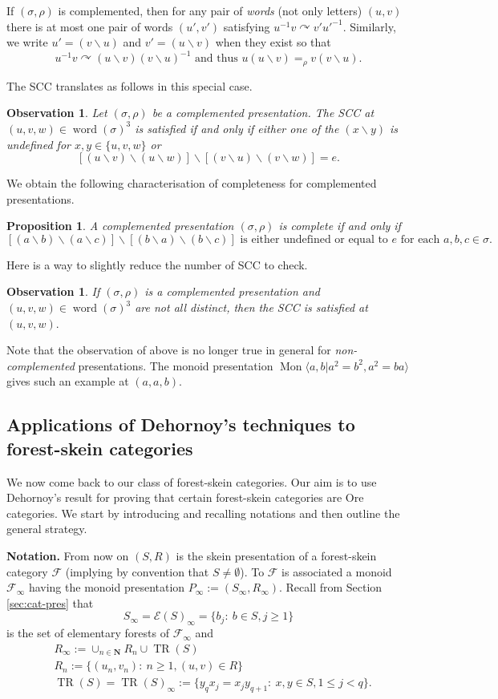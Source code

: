 \documentclass[a4paper, 12pt]{amsart}
\numberwithin{equation}{section}
\newtheorem{proposition}[theorem]{Proposition}
\newtheorem{observation}[theorem]{Observation}
\theoremstyle{definition}
\newcommand{\act}{\curvearrowright}
\newcommand{\bs}{\backslash}
\newcommand{\cE}{\mathcal E}
\newcommand{\cF}{\mathcal F}
\DeclareMathOperator{\Mon}{Mon}
\newcommand{\N}{\mathbf{N}}
\DeclareMathOperator{\TR}{TR}
\DeclareMathOperator{\word}{word}
\begin{document}
If $(\sigma,\rho)$ is complemented, then for any pair of \textit{words} (not only letters) $(u,v)$ there is at most one pair of words $(u',v')$ satisfying $u^{-1} v\act v'u'^{-1}.$
Similarly, we write $u'=(v\bs u)$ and $v'=(u\bs v)$ when they exist so that $$u^{-1} v \act (u\bs v) (v\bs u)^{-1} \text{ and thus } u (u\bs v) =_\rho v(v\bs u).$$

The SCC translates as follows in this special case.

\begin{observation}
Let $(\sigma,\rho)$ be a complemented presentation.
The SCC at $(u,v,w)\in \word(\sigma)^3$ is satisfied if and only if either one of the $(x\bs y)$ is undefined for $x,y\in\{u,v,w\}$ or
$$[(u\bs v)\bs (u\bs w)] \bs [(v\bs u) \bs (v\bs w)]=e.$$
\end{observation}

We obtain the following characterisation of completeness for complemented presentations.

\begin{proposition}
A complemented presentation $(\sigma,\rho)$ is complete if and only if $$[(a\bs b)\bs (a\bs c)]\bs [(b\bs a)\bs (b\bs c)] \text{ is either undefined or equal to } e \text{ for each } a,b,c\in \sigma.$$
\end{proposition}

Here is a way to slightly reduce the number of SCC to check.
\begin{observation}\label{obs:complemented}
If $(\sigma,\rho)$ is a complemented presentation and $(u,v,w)\in\word(\sigma)^3$ are not all distinct, then the SCC is satisfied at $(u,v,w).$ 
\end{observation}

Note that the observation of above is no longer true in general for {\it non-complemented} presentations. 
The monoid presentation $\Mon\langle a,b| a^2=b^2, a^2=ba\rangle$ gives such an example at $(a,a,b)$.

\subsection{Applications of Dehornoy's techniques to forest-skein categories}
We now come back to our class of forest-skein categories. Our aim is to use Dehornoy's result for proving that certain forest-skein categories are Ore categories. We start by introducing and recalling notations and then outline the general strategy.

{\bf Notation.}
From now on $(S,R)$ is the skein presentation of a forest-skein category $\cF$ (implying by convention that $S\neq\emptyset$).
To $\cF$ is associated a monoid $\cF_\infty$ having the monoid presentation $P_\infty:=(S_\infty,R_\infty)$. 
Recall from Section \ref{sec:cat-pres} that 
$$S_\infty=\cE(S)_\infty=\{b_j:\ b\in S, j\geq 1\}$$ is the set of elementary forests of $\cF_\infty$
and 
\begin{align*}
& R_\infty := \cup_{n\in\N} R_n \cup \TR(S) \\
& R_n:=\{ (u_n,v_n):\ n\geq 1, (u,v)\in R\}\\
& \TR(S)=\TR(S)_\infty:= \{ y_q x_j = x_j y_{q+1}:\ x,y\in S, 1\leq j<q\}.
\end{align*}
\end{document}

